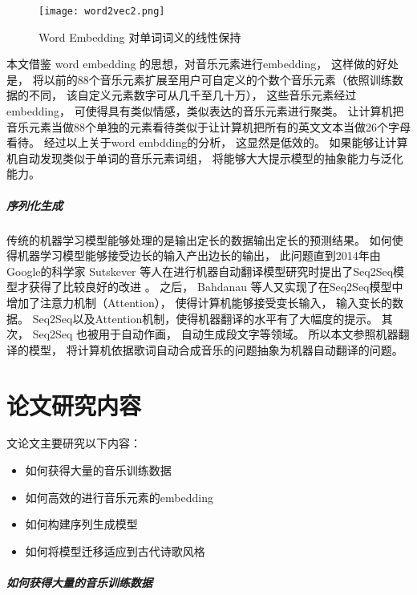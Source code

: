 \begin{figure}[htbp]
    \centering  %
    \texttt{[image: word2vec2.png]} %
    \caption{Word Embedding 对单词词义的线性保持} %
    \label{word2vec} %
\end{figure}

本文借鉴 word embedding 的思想，对音乐元素进行embedding， 这样做的好处是， 将以前的88个音乐元素扩展至用户可自定义的个数个音乐元素（依照训练数据的不同， 该自定义元素数字可从几千至几十万）， 这些音乐元素经过embedding， 可使得具有类似情感，类似表达的音乐元素进行聚类。 让计算机把音乐元素当做88个单独的元素看待类似于让计算机把所有的英文文本当做26个字母看待。 经过以上关于word embdding的分析， 这显然是低效的。 如果能够让计算机自动发现类似于单词的音乐元素词组， 将能够大大提示模型的抽象能力与泛化能力。 

\subparagraph{序列化生成} 传统的机器学习模型能够处理的是输出定长的数据输出定长的预测结果。 如何使得机器学习模型能够接受边长的输入产出边长的输出， 此问题直到2014年由Google的科学家 Sutskever 等人在进行机器自动翻译模型研究时提出了Seq2Seq模型才获得了比较良好的改进 \cite{DBLP:journals/corr/SutskeverVL14}。 之后，  Bahdanau 等人又实现了在Seq2Seq模型中增加了注意力机制（Attention）， 使得计算机能够接受变长输入， 输入变长的数据。 Seq2Seq以及Attention机制，使得机器翻译的水平有了大幅度的提示。 其次， Seq2Seq 也被用于自动作画， 自动生成段文字等领域。  所以本文参照机器翻译的模型， 将计算机依据歌词自动合成音乐的问题抽象为机器自动翻译的问题。


\section{论文研究内容}

文论文主要研究以下内容：

\begin{itemize}

	\item{如何获得大量的音乐训练数据}
	\item{如何高效的进行音乐元素的embedding}
	\item{如何构建序列生成模型}
	\item{如何将模型迁移适应到古代诗歌风格}

\end{itemize}

\subparagraph{如何获得大量的音乐训练数据}

